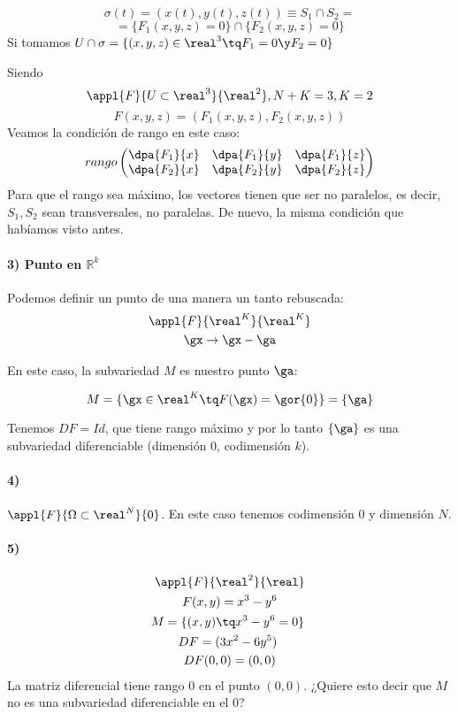   \[\sigma(t) = (x(t),y(t),z(t))\equiv S_1 \cap S_2 = \]
  \[= \{F_1(x,y,z) = 0\}\cap \{F_2(x,y,z) = 0\}\]
  Si tomamos $U\cap \sigma = \{(x,y,z)\in\real^3 \tq F_1 = 0 \y F_2 = 0\}$

  Siendo \[\appl{F}{U\subset\real^3}{\real^2}, N+K=3,K=2\]\[F(x,y,z) = (F_1(x,y,z),F_2(x,y,z))\]
  Veamos la condición de rango en este caso:
  \[rango \begin{pmatrix} \dpa{F_1}{x}&\dpa{F_1}{y}&\dpa{F_1}{z}\\\dpa{F_2}{x}&\dpa{F_2}{y}&\dpa{F_2}{z}\end{pmatrix}\]
  Para que el rango sea máximo, los vectores tienen que ser no paralelos, es decir, $S_1, S_2$ sean transversales, no paralelas. De nuevo, la misma condición que habíamos visto antes.
  
  \paragraph{3) Punto en $ℝ^k$}
  
  Podemos definir un punto de una manera un tanto rebuscada:
 \begin{gather*}
 \appl{F}{\real^K}{\real^K}\\
 \gx \rightarrow \gx - \ga
 \end{gather*}  
 
 En este caso, la subvariedad $M$ es nuestro punto $\ga$:
 
 \[M = \{\gx \in \real^K \tq F(\gx) = \gor{0}\} = \{\ga\}\]
 
 Tenemos $DF = Id $, que tiene rango máximo y por lo tanto $\{\ga\}$ es una subvariedad diferenciable (dimensión 0, codimensión $k$).
 
 \paragraph{4)} $\appl{F}{\Omega\subset\real^N}{0}$. En este caso tenemos codimensión $0$ y dimensión $N$.
 
\paragraph{5)}

  \begin{gather*}
  \appl{F}{\real^2}{\real}\\
   F(x,y) = x^3 - y^6 \\
  M = \{(x,y) \tq x^3-y^6 = 0\} \\
  DF = (3x^2-6y^5) \\
  DF(0,0) = (0,0)
  \end{gather*}
  La matriz diferencial tiene rango $0$ en el punto $(0,0)$. ¿Quiere esto decir que $M$ no es una subvariedad diferenciable en el 0?
  
